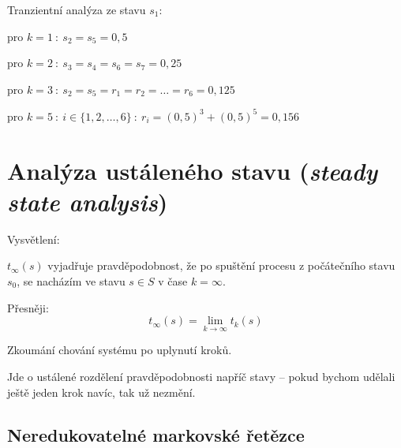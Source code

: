 \begin{compactitem}
    \item Tranzientní analýza ze stavu $s_1$: \begin{compactitem}
        \item pro $k = 1 ~:~ s_2 = s_5 = 0,5$
        \item pro $k = 2 ~:~ s_3 = s_4 = s_6 = s_7 = 0,25$
        \item pro $k = 3 ~:~ s_2 = s_5 = r_1 = r_2 = \ldots = r_6 = 0,125 $
        \item pro $k = 5 ~:~ i \in \{ 1, 2, \dots, 6 \} ~:~ r_i = (0,5)^3 + (0,5)^5 = 0,156$
    \end{compactitem}
\end{compactitem}


\section{Analýza ustáleného stavu (\textit{steady state analysis})}

\begin{compactitem}
    \item Vysvětlení: \begin{compactitem}
        \item $t_{\infty}(s)$ vyjadřuje pravděpodobnost, že po spuštění procesu z počátečního stavu $s_0$, se nacházím ve stavu $s \in S$ v čase $k = \infty$.

        \item Přesněji:
        $$ t_{\infty}(s) = \lim_{k \rightarrow \infty}{t_k(s)} $$
    \end{compactitem}

    \item Zkoumání chování systému po uplynutí  kroků.

    \item Jde o ustálené rozdělení pravděpodobnosti napříč stavy -- pokud bychom udělali ještě jeden krok navíc, tak už nezmění.


\end{compactitem}

\subsection{Neredukovatelné markovské řetězce}

